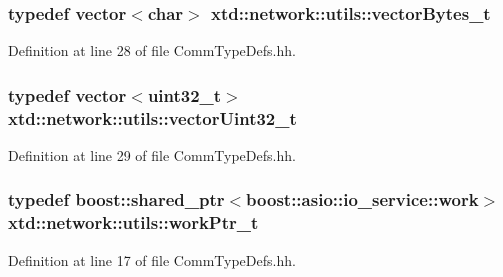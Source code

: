 \subsubsection[{\texorpdfstring{vector\+Bytes\+\_\+t}{vectorBytes_t}}]{\setlength{\rightskip}{0pt plus 5cm}typedef vector$<$char$>$ {\bf xtd\+::network\+::utils\+::vector\+Bytes\+\_\+t}}\hypertarget{namespacextd_1_1network_1_1utils_a9fedf0d18549b8034e9ae347955e9a9a}{}\label{namespacextd_1_1network_1_1utils_a9fedf0d18549b8034e9ae347955e9a9a}


Definition at line 28 of file Comm\+Type\+Defs.\+hh.

\subsubsection[{\texorpdfstring{vector\+Uint32\+\_\+t}{vectorUint32_t}}]{\setlength{\rightskip}{0pt plus 5cm}typedef vector$<$uint32\+\_\+t$>$ {\bf xtd\+::network\+::utils\+::vector\+Uint32\+\_\+t}}\hypertarget{namespacextd_1_1network_1_1utils_a2b135df55039cd8024b40ef3e1817681}{}\label{namespacextd_1_1network_1_1utils_a2b135df55039cd8024b40ef3e1817681}


Definition at line 29 of file Comm\+Type\+Defs.\+hh.

\subsubsection[{\texorpdfstring{work\+Ptr\+\_\+t}{workPtr_t}}]{\setlength{\rightskip}{0pt plus 5cm}typedef boost\+::shared\+\_\+ptr$<$boost\+::asio\+::io\+\_\+service\+::work$>$ {\bf xtd\+::network\+::utils\+::work\+Ptr\+\_\+t}}\hypertarget{namespacextd_1_1network_1_1utils_a9e0bae7b0da2b42ca8930a927f3a7c4d}{}\label{namespacextd_1_1network_1_1utils_a9e0bae7b0da2b42ca8930a927f3a7c4d}


Definition at line 17 of file Comm\+Type\+Defs.\+hh.



